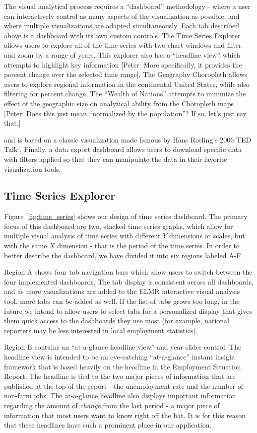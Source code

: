 \documentclass{sigchi}
\newcommand\Ben[1]{{\color{blue}#1}}	%
\begin{document}
{The visual analytical process requires a ``dashboard'' methodology - where a user can interactively control as many aspects of the visualization as possible, and where multiple visualizations are adapted simultaneously. Each tab described above is a dashboard with its own custom controls. The Time Series Explorer allows users to explore all of the time series with two chart windows and filter and zoom by a range of years. This explorer also has a ``headline view'' which attempts to highlight key information} [Peter: More specifically, it provides the percent change over the selected time range]. \Ben{The Geography Choropleth allows users to explore regional information in the continental United States, while also filtering for percent change. The ``Wealth of Nations'' attempts to minimize the effect of the geographic size on analytical ability from the Choropleth maps} [Peter: Does this just mean ``normalized by the population''? If so, let's just say that.] \Ben{and is based on a classic visualization made famous by Hans Rosling's 2006 TED Talk \cite{_wealth_????}. Finally, a data export dashboard allows users to download specific data with filters applied so that they can manipulate the data in their favorite visualization tools.

\subsection{Time Series Explorer}

Figure~\ref{fig:time_series} shows our design of time series dashboard. The primary focus of this dashboard are two, stacked time series graphs, which allow for multiple visual analysis of time series with different $Y$ dimensions or scales, but with the same $X$ dimension - that is the period of the time series. In order to better describe the dashboard, we have divided it into six regions labeled A-F.

Region A shows four tab navigation bars which allow users to switch between the four implemented dashboards. The tab display is consistent across all dashboards, and as more visualizations are added to the ELMR interactive visual analysis tool, more tabs can be added as well. If the list of tabs grows too long, in the future we intend to allow users to select tabs for a personalized display that gives them quick access to the dashboards they use most (for example, national reporters may be less interested in local employment statistics).

Region B contains an ``at-a-glance headline view'' and year slider control. The headline view is intended to be an eye-catching ``at-a-glance'' instant insight framework that is based heavily on the headline in the Employment Situation Report. The headline is tied to the two major pieces of information that are published at the top of the report - the unemployment rate and the number of non-farm jobs. The at-a-glance headline also displays important information regarding the amount of \textit{change} from the last period - a major piece of information that most users want to know right off the bat. It is for this reason that these headlines have such a prominent place in our application.

}
\end{document}
